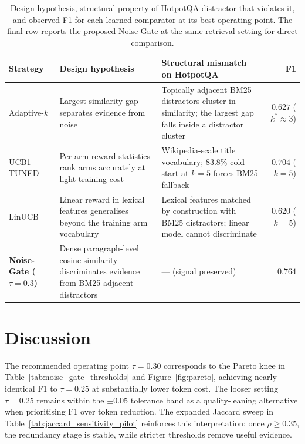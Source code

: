 \documentclass[runningheads]{llncs}
\begin{document}
\begin{table}[t]
\centering
\small
\caption{Design hypothesis, structural property of HotpotQA distractor that violates it, and observed F1 for each learned comparator at its best operating point. The final row reports the proposed Noise-Gate at the same retrieval setting for direct comparison.}
\label{tab:failure_matrix}
\begin{tabular}{>{\raggedright\arraybackslash}p{2.4cm}>{\raggedright\arraybackslash}p{3.0cm}>{\raggedright\arraybackslash}p{4.2cm}r}
\toprule
Strategy & Design hypothesis & Structural mismatch on HotpotQA & F1 \\
\midrule
Adaptive-$k$ & Largest similarity gap separates evidence from noise & Topically adjacent BM25 distractors cluster in similarity; the largest gap falls inside a distractor cluster & $0.627$ ($k^*{\approx}3$) \\
UCB1-TUNED & Per-arm reward statistics rank arms accurately at light training cost & Wikipedia-scale title vocabulary; $83.8\%$ cold-start at $k{=}5$ forces BM25 fallback & $0.704$ ($k{=}5$) \\
LinUCB & Linear reward in lexical features generalises beyond the training arm vocabulary & Lexical features matched by construction with BM25 distractors; linear model cannot discriminate & $0.620$ ($k{=}5$) \\
\midrule
\textbf{Noise-Gate ($\tau{=}0.3$)} & Dense paragraph-level cosine similarity discriminates evidence from BM25-adjacent distractors & --- (signal preserved) & $\mathbf{0.764}$ \\
\bottomrule
\end{tabular}
\end{table}

\section{Discussion}
\label{sec:discussion}

The recommended operating point $\tau{=}0.30$ corresponds to the Pareto knee in Table~\ref{tab:noise_gate_thresholds} and Figure~\ref{fig:pareto}, achieving nearly identical F1 to $\tau{=}0.25$ at substantially lower token cost. The looser setting $\tau{=}0.25$ remains within the $\pm 0.05$ tolerance band as a quality-leaning alternative when prioritising F1 over token reduction. The expanded Jaccard sweep in Table~\ref{tab:jaccard_sensitivity_pilot} reinforces this interpretation: once $\rho \ge 0.35$, the redundancy stage is stable, while stricter thresholds remove useful evidence.
\end{document}
